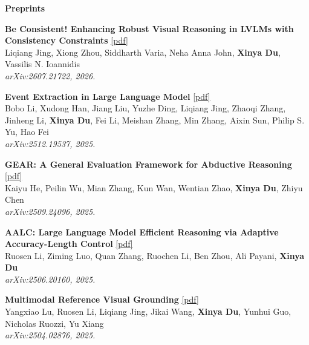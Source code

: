 \vspace{1.5mm}
\noindent \textbf{Preprints}
\begin{enumerate}[{[}1{]},resume,leftmargin=*]

\parbox{\linewidth}{
\item\label{pub:beconsistent}
{\bf Be Consistent! Enhancing Robust Visual Reasoning in LVLMs with Consistency Constraints}
\href{https://arxiv.org/abs/2607.21722}{{{[pdf]}}} \\
Liqiang Jing, Xiong Zhou, Siddharth Varia, Neha Anna John, \textbf{Xinya Du}, Vassilis N. Ioannidis \\
{\it arXiv:2607.21722, 2026.} \\
}

\parbox{\linewidth}{
\item\label{pub:eellm}
{\bf Event Extraction in Large Language Model}
\href{https://arxiv.org/abs/2512.19537}{{{[pdf]}}} \\
Bobo Li, Xudong Han, Jiang Liu, Yuzhe Ding, Liqiang Jing, Zhaoqi Zhang, Jinheng Li, \textbf{Xinya Du}, Fei Li, Meishan Zhang, Min Zhang, Aixin Sun, Philip S. Yu, Hao Fei \\
{\it arXiv:2512.19537, 2025.} \\
}

\parbox{\linewidth}{
\item\label{pub:gear}
{\bf GEAR: A General Evaluation Framework for Abductive Reasoning}
\href{https://arxiv.org/abs/2509.24096}{{{[pdf]}}} \\
Kaiyu He, Peilin Wu, Mian Zhang, Kun Wan, Wentian Zhao, \textbf{Xinya Du}, Zhiyu Chen \\
{\it arXiv:2509.24096, 2025.} \\
}

\parbox{\linewidth}{
\item\label{pub:aalc}
{\bf AALC: Large Language Model Efficient Reasoning via Adaptive Accuracy-Length Control}
\href{https://arxiv.org/abs/2506.20160}{{{[pdf]}}} \\
Ruosen Li, Ziming Luo, Quan Zhang, Ruochen Li, Ben Zhou, Ali Payani, \textbf{Xinya Du} \\
{\it arXiv:2506.20160, 2025.} \\
}

\parbox{\linewidth}{
\item\label{pub:mrvg}
{\bf Multimodal Reference Visual Grounding}
\href{https://arxiv.org/abs/2504.02876}{{{[pdf]}}} \\
Yangxiao Lu, Ruosen Li, Liqiang Jing, Jikai Wang, \textbf{Xinya Du}, Yunhui Guo, Nicholas Ruozzi, Yu Xiang \\
{\it arXiv:2504.02876, 2025.} \\
}


\end{enumerate}
